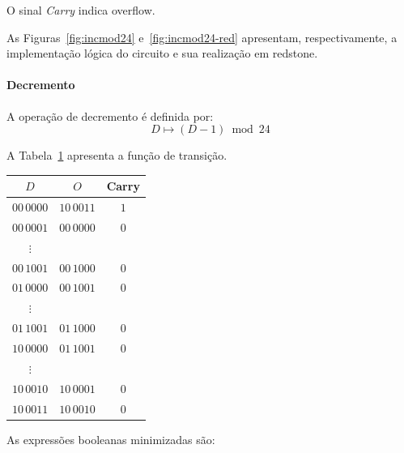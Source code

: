 O sinal \textit{Carry} indica overflow.

As Figuras~\ref{fig:incmod24} e~\ref{fig:incmod24-red} apresentam, respectivamente, a implementação lógica do circuito e sua realização em redstone.


\paragraph{Decremento}
A operação de decremento é definida por:
\[
D \mapsto (D - 1) \bmod 24
\]

A Tabela~\ref{tab:dec_mod24} apresenta a função de transição.

\begin{table} [htbp] \label{tab:dec_mod24}
\begin{center}
\begin{tabular}{c|cc}
    $D$ & $O$ & Carry \\
    \hline
    $00\,0000$ & $10\,0011$ & $1$ \\
    $00\,0001$ & $00\,0000$ & $0$ \\
    $\vdots$ &  &  \\
    $00\,1001$ & $00\,1000$ & $0$ \\
    $01\,0000$ & $00\,1001$ & $0$ \\
    $\vdots$ &  &  \\
    $01\,1001$ & $01\,1000$ & $0$ \\
    $10\,0000$ & $01\,1001$ & $0$ \\
    $\vdots$ &  &  \\
    $10\,0010$ & $10\,0001$ & $0$ \\
    $10\,0011$ & $10\,0010$ & $0$ \\
\end{tabular}
\end{center}
\end{table}

As expressões booleanas minimizadas são:

